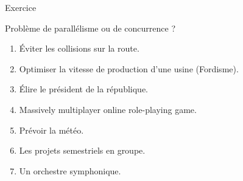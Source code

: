 
\begingroup

\begin{frame}{Exercice}

  \begin{alertblock}{Problème de parallélisme ou de concurrence ?}
    \begin{enumerate} 
    \item Éviter les collisions sur la route.
    \item Optimiser la vitesse de production d'une usine (Fordisme).
    \item Élire le président de la république.
    \item Massively multiplayer online role-playing game.
    \item Prévoir la météo.
    \item Les projets semestriels en groupe.
    \item Un orchestre symphonique.
    \end{enumerate} 
  \end{alertblock}
\end{frame}

\endgroup
\endinput
